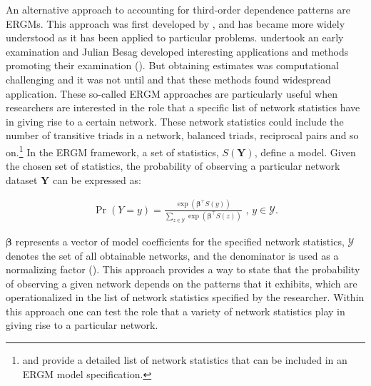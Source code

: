 \documentclass[12pt,pdflatex]{elsarticle}
\begin{document}
An alternative approach to accounting for third-order dependence patterns are ERGMs. This approach was first developed by \citet{erdos:renyi:1959}, and has became more widely understood as it has been applied to particular problems. \citet{frank:1971} undertook an early examination and Julian Besag developed interesting applications and methods promoting their examination (\citealt{besag:1977b}). But obtaining estimates was computational challenging and it was not until \citet{frank:strauss:1986} and \citet{wasserman:pattison:1996} that these methods found widespread application. These so-called ERGM approaches are particularly useful when researchers are interested in the role that a specific list of network statistics have in giving rise to a certain network. These network statistics could include the number of transitive triads in a network, balanced triads, reciprocal pairs and so on.\footnote{\citet{morris:etal:2008} and \citet{snijders:etal:2006} provide a detailed list of network statistics that can be included in an ERGM model specification.} In the ERGM framework, a set of statistics, $S(\mathbf{Y})$, define a model. Given the chosen set of statistics, the probability of observing a particular network dataset $\mathbf{Y}$ can be expressed as:

\begin{align}
\Pr(Y = y) = \frac{ \exp( \bm\beta^{\top} S(y)  )  }{ \sum_{z \in \mathcal{Y}} \exp( \bm\beta^{\top} S(z)  )  } \text{ ,  } y \in \mathcal{Y}.
\label{eqn:ergm}
\end{align}

$\bm\beta$ represents a vector of model coefficients for the specified network statistics, $\mathcal{Y}$ denotes the set of all obtainable networks, and the denominator is used as a normalizing factor (\citealt{hunter:etal:2008}). This approach provides a way to state that the probability of observing a given network depends on the patterns that it exhibits, which are operationalized in the list of network statistics specified by the researcher. Within this approach one can test the role that a variety of network statistics play in giving rise to a particular network.
\end{document}
